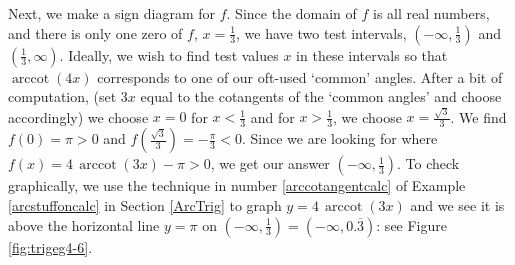 {\begin{enumerate}
Next, we make a sign diagram for $f$.  Since the domain of $f$ is all real numbers, and there is only one zero of $f$, $x = \frac{1}{3}$, we have two test intervals, $\left(-\infty, \frac{1}{3}\right)$ and  $\left(\frac{1}{3}, \infty \right)$. Ideally, we wish to find test values $x$ in these intervals so that $\operatorname{arccot}(4x)$ corresponds to one of our oft-used `common' angles.  After a bit of computation, (set $3x$ equal to the cotangents of the `common angles' and choose accordingly) we choose $x=0$ for $x < \frac{1}{3}$ and for $x > \frac{1}{3}$, we choose $x = \frac{\sqrt{3}}{3}$.  We find $f(0) = \pi > 0$ and $f\left(\frac{\sqrt{3}}{3}\right) = -\frac{\pi}{3} < 0$.  Since we are looking for where $f(x) = 4 \, \operatorname{arccot}(3x) -  \pi > 0$, we get our answer $\left(-\infty, \frac{1}{3}\right)$.  To check graphically, we use the technique in number \ref{arccotangentcalc} of Example \ref{arcstuffoncalc} in Section \ref{ArcTrig} to graph $y = 4 \, \operatorname{arccot}(3x)$  and we see it is above the horizontal line $y = \pi$ on $\left(-\infty, \frac{1}{3}\right) = \left(-\infty, 0.\overline{3}\right)$: see Figure \ref{fig:trigeg4-6}.



\end{enumerate}
}
 

